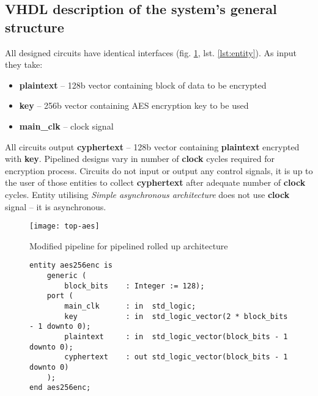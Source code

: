 

\subsection{VHDL description of the system's general structure}
All designed circuits have identical interfaces (fig. \ref{fig:top-aes}, lst. \ref{lst:entity}). As input they take:
\begin{itemize}[noitemsep]
\item \textbf{plaintext} -- 128b vector containing block of data to be encrypted
\item \textbf{key} -- 256b vector containing AES encryption key to be used
\item \textbf{main\_clk} -- clock signal
\end{itemize}
All circuits output \textbf{cyphertext} -- 128b vector containing \textbf{plaintext} encrypted with \textbf{key}. Pipelined designs vary in number of \textbf{clock} cycles required for encryption process. Circuits do not input or output any control signals, it is up to the user of those entities to collect \textbf{cyphertext} after adequate number of \textbf{clock} cycles. Entity utilising \textit{Simple asynchronous architecture} does not use \textbf{clock} signal -- it is asynchronous.

\begin{figure}[!h]
\centering
\texttt{[image: top-aes]}
\caption{Modified pipeline for pipelined rolled up architecture}
\label{fig:top-aes}
\end{figure}

\begin{figure}[!h]
\begin{lstlisting}[style=vhdl, caption={AES encryption VHDL entity}, label={lst:entity}, captionpos=b]
entity aes256enc is
	generic (
		block_bits    : Integer := 128);
	port (
		main_clk      : in  std_logic;
		key           : in  std_logic_vector(2 * block_bits - 1 downto 0);
		plaintext     : in  std_logic_vector(block_bits - 1 downto 0);
		cyphertext    : out std_logic_vector(block_bits - 1 downto 0)
	);
end aes256enc;
\end{lstlisting}
\end{figure}


